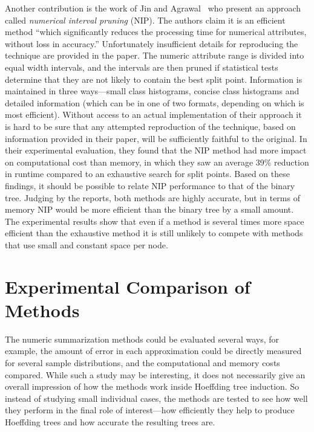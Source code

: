 Another contribution is the work of Jin and Agrawal~\cite{nip} who present an approach called {\em numerical interval pruning} (NIP). The authors claim it is an efficient method ``which significantly reduces the processing time for numerical attributes, without loss in accuracy.'' Unfortunately insufficient details for reproducing the technique are provided in the paper. The numeric attribute range is divided into equal width intervals, and the intervals are then pruned if statistical tests determine that they are not likely to contain the best split point. Information is maintained in three ways---small class histograms, concise class histograms and detailed information (which can be in one of two formats, depending on which is most efficient). Without access to an actual implementation of their approach it is hard to be sure that any attempted reproduction of the technique, based on information provided in their paper, will be sufficiently faithful to the original. In their experimental evaluation, they found that the NIP method had more impact on computational cost than memory, in which they saw an average 39\% reduction in runtime compared to an exhaustive search for split points. Based on these findings, it should be possible to relate NIP performance to that of the binary tree. Judging by the reports, both methods are highly accurate, but in terms of memory NIP would be more efficient than the binary tree by a small amount. The experimental results show that even if a method is several times more space efficient than the exhaustive method it is still unlikely to compete with methods that use small and constant space per node.

\BEGINOMIT
\section{Experimental Comparison of Methods}
\label{sec:numexp}

The numeric summarization methods could be evaluated several ways, for example, the amount of error in each approximation could be directly measured for several sample distributions, and the computational and memory costs compared. While such a study may be interesting, it does not necessarily give an overall impression of how the methods work inside Hoeffding tree induction. So instead of studying small individual cases, the methods are tested to see how well they perform in the final role of interest---how efficiently they help to produce Hoeffding trees and how accurate the resulting trees are.

